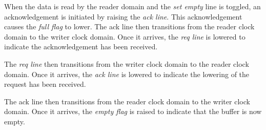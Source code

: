         When the data is read by the reader domain and the {\it set empty} line is toggled, an acknowledgement is initiated by raising the {\it ack line}. This acknowledgement causes the {\it full flag} to lower. The {ack line} then transitions from the reader clock domain to the writer clock domain. Once it arrives, the {\it req line} is lowered to indicate the acknowledgement has been received.

        The {\it req line} then transitions from the writer clock domain to the reader clock domain. Once it arrives, the {\it ack line} is lowered to indicate the lowering of the request has been received.

        The {ack line} then transitions from the reader clock domain to the writer clock domain. Once it arrives, the {\it empty flag} is raised to indicate that the buffer is now empty.

